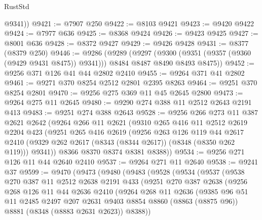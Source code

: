 \begin{lexlean}{RustStd}
\begin{coremodule}
{\begin{coremodule}
{{{{{{{{{{{{{{{{{{{{{{{{{{{{{{{{{{{{{{{{{{{{{{{{{{        @9341))
@9421 := @7907 @250
@9422 := @8103 @9421
@9423 := @9420 @9422
@9424 := @7977 @636
@9425 := @8368 @9424
@9426 := @9423 @9425
@9427 := @8001 @636
@9428 := @8372 @9427
@9429 := @9426 @9428
@9431 := @8377 (@8379 @250)
@9446 := @9286
    (@9289
      (@9297
        (@9300 (@9351 (@9357 (@9360 (@9429 @9431 @8475)) @9341)))
        @8484
        @8487
        @8490
        @8493
        @8475))
@9452 := @9256 @371 @126 @41 @44 @2802 @2410
@9455 := @9264 @371 @41 @2802
@9461 := @9271 @370 @8254 @2512 @2801 @2395 @8263
@9464 := @9251 @370 @8254 @2801
@9470 := @9256 @275 @369 @11 @45 @2645 @2800
@9473 := @9264 @275 @11 @2645
@9480 := @9290 @274 @388 @11 @2512 @2643 @2191 @413
@9483 := @9251 @274 @388 @2643
@9528 := @9256
    @266
    @273
    @11
    @387
    @2621
    @2642
    (@9264
      @266
      @11
      @2621
      (@9310
        @265
        @416
        @11
        @2512
        @2619
        @2204
        @423
        (@9251
          @265
          @416
          @2619
          (@9256
            @263
            @126
            @119
            @44
            @2617
            @2410
            (@9329 @262 @2617 (@8343 (@8344 @2617)) (@8348 (@8350 @262 @119)))
            @9341))
        @8366
        @8370
        @8374
        @8381
        @8388))
@9534 := @9256 @271 @126 @11 @44 @2640 @2410
@9537 := @9264 @271 @11 @2640
@9538 := @9241 @37
@9599 := @9470
    (@9473
      (@9480
        (@9483
          (@9528
            (@9534
              (@9537
                (@9538
                  @270
                  @387
                  @11
                  @2512
                  @2638
                  @2191
                  @433
                  (@9251
                    @270
                    @387
                    @2638
                    (@9256
                      @268
                      @126
                      @11
                      @44
                      @2636
                      @2410
                      (@9264
                        @268
                        @11
                        @2636
                        (@9385
                          @96
                          @51
                          @11
                          @2485
                          @2497
                          @207
                          @2631
                          @9403
                          @8854
                          @8860
                          (@8863 (@8875 @96))
                          @8881
                          (@8348 (@8883 @2631 @2623))
                          @8388))
}}}}}}}}}}}}}}}}}}}}}}}}}}}}}}}}}}}}}}}}}}}}}}}}}}
\end{coremodule}}
\end{coremodule}
\end{lexlean}

